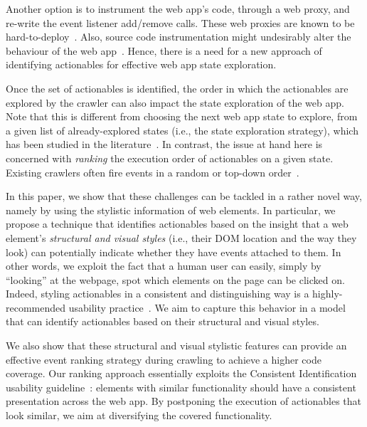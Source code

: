 Another option is to instrument the web app's \js code, 
through a web proxy, and re-write the event listener add/remove calls.
These web proxies are known to be hard-to-deploy~\cite{Burg:2013:InteractiveRecordReply}.
Also, source code instrumentation
might undesirably alter the behaviour of the web app~\cite{Richards:2011:ConstructionOfJSBenchmarks}.
Hence, there is a need for a new approach
of identifying actionables for effective web app state exploration.

Once the set of actionables is identified,
the order in which the actionables are explored by the crawler
can also impact the state exploration of the web app.
Note that this is different from choosing the next web
app {state} to explore, from a given list of 
already-explored states (i.e., the state exploration strategy),
which has been studied in the
literature~\cite{MilaniFard:2013:FeedEx,
Benjamin:2011:StrategyHypercube:ICWE,
Choudhary:2012:MCrawler:Thesis, Choudhary:2013:MenuModel:ICWE,
Dincturk:2013:ModelBasedCrawlingStrategy,
Dincturk:2012:StatisticalStrategy,
Dincturk:2014:ModelBasedForRIA:TWEB,
Benjamin:2007:StrategyHypercube:Thesis}.
In contrast, the issue at hand here is concerned with
\emph{ranking} the execution order of
actionables on a given state.
Existing crawlers often fire events
in a random or top-down order~\cite{Mesbah:2012:Crawljax}.

In this paper, we show that these challenges
can be tackled in a rather novel way, namely by  
using the stylistic information of web elements.
In particular, we propose a technique that
identifies actionables based on the insight that 
a web element's \textit{structural and visual styles}
(i.e., their DOM location and the way they look)
can potentially indicate whether they have 
events attached to them.
In other words, we exploit the fact that 
a human user can easily, simply by ``looking'' at the webpage, 
spot which elements on the page can be clicked on.
Indeed, styling actionables in a consistent and 
distinguishing way is a highly-recommended usability practice~\cite{w3c-actionable-elements, bbc-actionables-usability-tips}.
We aim to capture this behavior in a model that can 
identify actionables based on their structural and visual styles.

We also show that these structural and visual stylistic
features can provide an effective
event ranking strategy during crawling to achieve a higher code coverage.
Our ranking approach essentially exploits
the Consistent Identification usability guideline~\cite{w3c-consistent-identification}:
elements with similar functionality should have a consistent presentation across the web app.
By postponing the execution of actionables that look similar,
we aim at diversifying the covered functionality.

